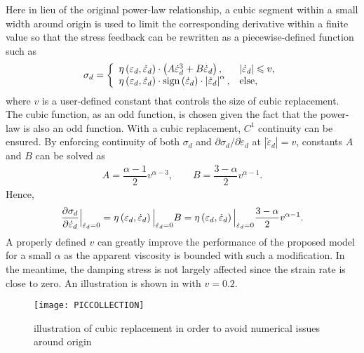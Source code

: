 Here in lieu of the original power-law relationship, a cubic segment within a small width around origin is used to limit the corresponding derivative within a finite value so that the stress feedback can be rewritten as a piecewise-defined function such as
\begin{gather}
\sigma_d=\left\{
\begin{array}{ll}
\eta\left(\varepsilon_d,\dot\varepsilon_d\right)\cdot\left(A\dot{\varepsilon}_d^3+B\dot{\varepsilon}_d\right),&\left\lvert\dot{\varepsilon}_d\right\rvert\leqslant{}v,\\
\eta\left(\varepsilon_d,\dot\varepsilon_d\right)\cdot\mathrm{sign}\left(\dot{\varepsilon}_d\right)\cdot\left\lvert\dot{\varepsilon}_d\right\rvert^{\alpha},&\text{else},
\end{array}
\right.
\end{gather}
where $v$ is a user-defined constant that controls the size of cubic replacement. The cubic function, as an odd function, is chosen given the fact that the power-law  is also an odd function. With a cubic replacement, $C^1$ continuity can be ensured. By enforcing continuity of both $\sigma_d$ and $\partial\sigma_d/\partial\dot\varepsilon_d$ at $\left\lvert\dot{\varepsilon}_d\right\rvert=v$, constants $A$ and $B$ can be solved as
\begin{gather}
A=\dfrac{\alpha-1}{2}v^{\alpha-3},\qquad
B=\dfrac{3-\alpha}{2}v^{\alpha-1}.
\end{gather}
Hence,
\begin{gather}\label{eq:max_der}
\dfrac{\partial\sigma_d}{\partial\dot{\varepsilon}_d}\Big\vert_{\dot{\varepsilon}_d=0}=\eta\left(\varepsilon_d,\dot\varepsilon_d\right)\Big\vert_{\dot{\varepsilon}_d=0}B=\eta\left(\varepsilon_d,\dot\varepsilon_d\right)\Big\vert_{\dot{\varepsilon}_d=0}\dfrac{3-\alpha}{2}v^{\alpha-1}.
\end{gather}
A properly defined $v$ can greatly improve the performance of the proposed model for a small $\alpha$ as the apparent viscosity is bounded with such a modification. In the meantime, the damping stress is not largely affected since the strain rate is close to zero. An illustration is shown in  with $v=0.2$.
\begin{figure}[htb]
\scriptsize\centering
\texttt{[image: PICCOLLECTION]}
\caption{illustration of cubic replacement in order to avoid numerical issues around origin}\label{fig:cubic}
\end{figure}

